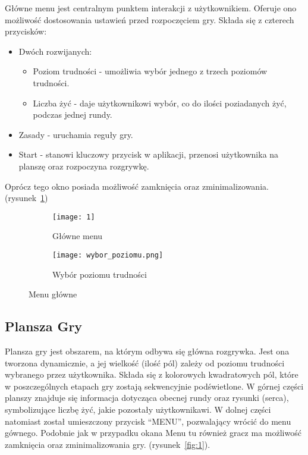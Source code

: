 \documentclass[]{report}
\begin{document}
Główne menu jest centralnym punktem interakcji z użytkownikiem. Oferuje ono możliwość dostosowania ustawień przed rozpoczęciem gry. Składa się z czterech przycisków:
\begin{itemize}
	\item Dwóch rozwijanych:
		\begin{itemize}
			\item Poziom trudności - umożliwia wybór jednego z trzech poziomów trudności.
			\item Liczba żyć - daje użytkownikowi wybór, co do ilości poziadanych żyć, podczas jednej rundy.
		\end{itemize}
	\item Zasady - uruchamia reguły gry.
	\item Start - stanowi kluczowy przycisk w aplikacji, przenosi użytkownika na planszę oraz rozpoczyna rozgrywkę.
\end{itemize}
 Oprócz tego okno posiada możliwość zamknięcia oraz zminimalizowania.(rysunek~\ref{fig:menu})

\begin{figure}[h]
	\centering
	\begin{subfigure}{0.4\textwidth}
		\centering
		\texttt{[image: 1]}
		\caption{Główne menu}
		\label{fig:menu}
	\end{subfigure}
	\hspace{1cm} %
	\begin{subfigure}{0.4\textwidth}
		\centering
		\texttt{[image: wybor\_poziomu.png]}
		\caption{Wybór poziomu trudności}
		\label{fig:wybor_poziomu}
	\end{subfigure}
	\caption{Menu główne}
	\label{fig:Interface_menu}
\end{figure}


\subsection*{Plansza Gry}

Plansza gry jest obszarem, na którym odbywa się główna rozgrywka. Jest ona tworzona dynamicznie, a jej wielkość (ilość pól) zależy od poziomu trudności wybranego przez użytkownika. Składa się z kolorowych kwadratowych pól, które w poszczególnych etapach gry zostają sekwencyjnie podświetlone. W górnej części planszy znajduje się informacja dotycząca obecnej rundy oraz rysunki (serca), symbolizujące liczbę żyć, jakie pozostały użytkownikawi. W dolnej części natomiast został umieszczony przycisk \enquote{MENU}, pozwalający wrócić do menu gównego. Podobnie jak w przypadku okana Menu tu również gracz ma możliwość zamknięcia oraz zminimalizowania gry. (rysunek~\ref{fig:1}). 
\end{document}
